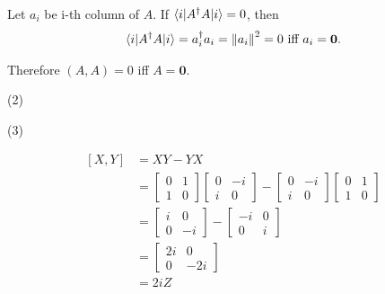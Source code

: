 Let $a_i$ be i-th column of $A$.
If $\braket{ i | A^\dagger A | i } = 0$, then
\begin{align*}
	\braket{ i | A^\dagger A | i } = a^\dagger_i a_i = \left\lVert a_i\right\rVert^2 = 0 \text{ iff }a_i = \mathbf{0}.
\end{align*}

Therefore $(A, A) = 0$ iff $A = \mathbf{0}$.

\vspace{5mm}
(2)

(3)


%
%

\begin{align*}
	\left[X, Y \right] &=XY - YX\\
		&= \begin{bmatrix}
		0 & 1 \\
		1 & 0
		\end{bmatrix}
		\begin{bmatrix}
		0 & -i \\
		i & 0
		\end{bmatrix}
		-
		\begin{bmatrix}
		0 & -i \\
		i & 0
		\end{bmatrix}
		\begin{bmatrix}
		0 & 1 \\
		1 & 0
		\end{bmatrix} \\
%
		&=
%
		\begin{bmatrix}
			i & 0 \\
			0 & -i
		\end{bmatrix}
		-
		\begin{bmatrix}
			-i & 0 \\
			0 & i
		\end{bmatrix}\\
%
		&=
%
		\begin{bmatrix}
			2i & 0 \\
			0 & -2i
		\end{bmatrix} \\
%
		&=	2i Z
\end{align*}



